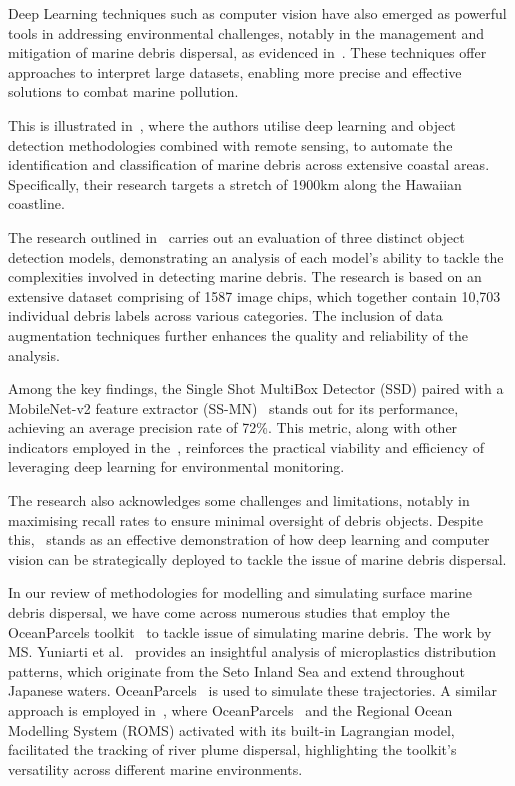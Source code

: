 Deep Learning techniques such as computer vision have also emerged as powerful tools in addressing environmental challenges, notably in the management and mitigation of marine debris dispersal, as evidenced in~\cite{36}. These techniques offer approaches to interpret large datasets, enabling more precise and effective solutions to combat marine pollution.

This is illustrated in~\cite{36}, where the authors utilise deep learning and object detection methodologies combined with remote sensing, to automate the identification and classification of marine debris across extensive coastal areas. Specifically, their research targets a stretch of 1900km along the Hawaiian coastline.

The research outlined in~\cite{36} carries out an evaluation of three distinct object detection models, demonstrating an analysis of each model's ability to tackle the complexities involved in detecting marine debris. The research is based on an extensive dataset comprising of 1587 image chips, which together contain 10,703 individual debris labels across various categories. The inclusion of data augmentation techniques further enhances the quality and reliability of the analysis.

Among the key findings, the Single Shot MultiBox Detector (SSD) paired with a MobileNet-v2 feature extractor (SS-MN)~\cite{39} stands out for its performance, achieving an average precision rate of 72\%. This metric, along with other indicators employed in the~\cite{36}, reinforces the practical viability and efficiency of leveraging deep learning for environmental monitoring. 

The research also acknowledges some challenges and limitations, notably in maximising recall rates to ensure minimal oversight of debris objects. Despite this,~\cite{36} stands as an effective demonstration of how deep learning and computer vision can be strategically deployed to tackle the issue of marine debris dispersal.\newline

In our review of methodologies for modelling and simulating surface marine debris dispersal, we have come across numerous studies that employ the OceanParcels toolkit~\cite{20} to tackle issue of simulating marine debris. The work by MS. Yuniarti et al.~\cite{37} provides an insightful analysis of microplastics distribution patterns, which originate from the Seto Inland Sea and extend throughout Japanese waters. OceanParcels~\cite{20} is used to simulate these trajectories. A similar approach is employed in~\cite{38}, where OceanParcels~\cite{20} and the Regional Ocean Modelling System (ROMS) activated with its built-in Lagrangian model, facilitated the tracking of river plume dispersal, highlighting the toolkit's versatility across different marine environments.


